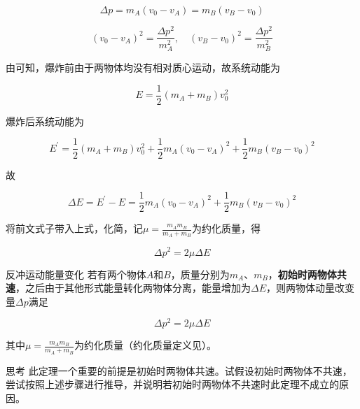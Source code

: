 $$\Delta p = m_A (v_0 - v_A) = m_B (v_B - v_0)$$

$$(v_0 - v_A)^2 = \frac{\Delta p^2}{m_A^2} ,\quad (v_B - v_0)^2 = \frac{\Delta p^2}{m_B^2}$$

由可知，爆炸前由于两物体均没有相对质心运动，故系统动能为

$$E = \frac{1}{2} (m_A + m_B) v_0^2$$

爆炸后系统动能为

$$E^{\prime} = \frac{1}{2} (m_A + m_B) v_0^2 + \frac{1}{2} m_A (v_0 - v_A)^2 + \frac{1}{2} m_B (v_B - v_0)^2$$

故

$$\Delta E = E^{\prime} - E = \frac{1}{2} m_A (v_0 - v_A)^2 + \frac{1}{2} m_B (v_B - v_0)^2$$

将前文式子带入上式，化简，记$\mu = \frac{m_A m_B}{m_A + m_B}$为约化质量，得

$$\Delta p^2 = 2 \mu \Delta E$$

\begin{theo}{反冲运动能量变化}{}
若有两个物体$A$和$B$，质量分别为$m_A$、$m_B$，\textbf{初始时两物体共速}，之后由于其他形式能量转化两物体分离，能量增加为$\Delta E$，则两物体动量改变量$\Delta p$满足

$$\Delta p^2 = 2 \mu \Delta E$$

其中$\mu = \frac{m_A m_B}{m_A + m_B}$为约化质量（约化质量定义见）。
\end{theo}

\begin{mk}{思考}{}
此定理一个重要的前提是初始时两物体共速。试假设初始时两物体不共速，尝试按照上述步骤进行推导，并说明若初始时两物体不共速时此定理不成立的原因。
\end{mk}